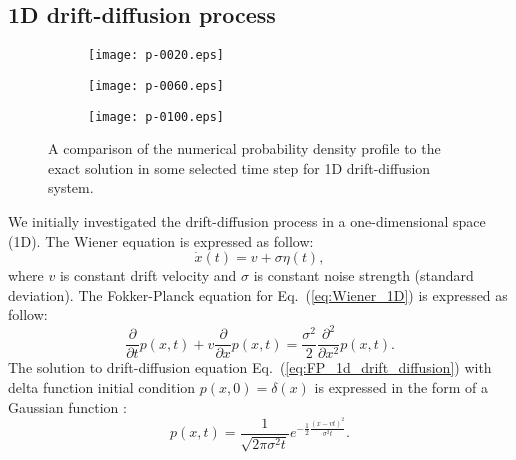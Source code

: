 \documentclass[aps,pre,reprint,superscriptaddress,showpacs,amsmath
,floatfix
]{revtex4-2}
\newcommand{\eq}[1]{Eq.~(\ref{#1})}
\begin{document}
\subsection{1D drift-diffusion process}
\begin{figure}
     \centering
     \begin{subfigure}[b]{0.4\textwidth}
         \centering
         \texttt{[image: p-0020.eps]}
     \end{subfigure}
     \hfill
     \begin{subfigure}[b]{0.4\textwidth}
         \centering
         \texttt{[image: p-0060.eps]}
     \end{subfigure}
     \hfill
     \begin{subfigure}[b]{0.4\textwidth}
         \centering
         \texttt{[image: p-0100.eps]}
     \end{subfigure}
        \caption{
A comparison of the numerical probability density profile to the exact solution in some selected time step for 1D drift-diffusion system.
        }
        \label{fig:p1d}
\end{figure}

We initially investigated the drift-diffusion process in a one-dimensional space (1D). The Wiener equation is expressed as follow:
\begin{equation}\label{eq:Wiener_1D}
    \dot{x}(t) = v + \sigma\eta(t),
\end{equation}
where $v$ is constant drift velocity and $\sigma$ is constant noise strength (standard deviation). The Fokker-Planck equation for \eq{eq:Wiener_1D} is expressed as follow: 
\begin{equation}\label{eq:FP_1d_drift_diffusion}
    \frac{\partial }{\partial t} p(x,t) + v\frac{\partial}{\partial x}p(x,t) = \frac{\sigma^2}{2}\frac{\partial^2}{\partial x^2}p(x,t) .
\end{equation} 
The solution to drift-diffusion equation \eq{eq:FP_1d_drift_diffusion} with delta function initial condition $p(x,0)=\delta(x)$ is expressed in the form of a Gaussian function \cite{risken1996fokker, frank2005nonlinear}:
\begin{equation}\label{eq:1d_drift_diffusion_sol}
    p(x,t) = \frac{1}{\sqrt{2\pi \sigma^2 t}} e^{- \frac{1}{2} \frac{(x-vt)^2}{\sigma^2 t}} .
\end{equation}
\end{document}
